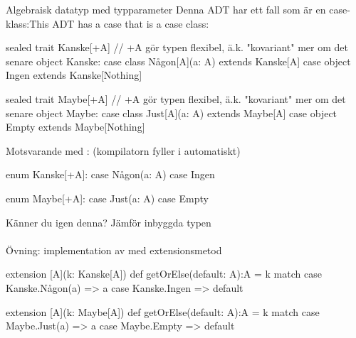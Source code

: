 \begin{Slide}{Algebraisk datatyp med typparameter}\SlideFontSmall
\ifswedish Denna ADT har ett fall som är en  case-klass:\else This ADT has a case that is a  case class:\fi     
\ifswedish
\begin{CodeSmall}
sealed trait Kanske[+A]   // +A gör typen flexibel, ä.k. "kovariant" mer om det senare
object Kanske:
  case class Någon[A](a: A) extends Kanske[A]
  case object Ingen extends Kanske[Nothing]   
\end{CodeSmall}
\else
\begin{CodeSmall}
sealed trait Maybe[+A]   // +A gör typen flexibel, ä.k. "kovariant" mer om det senare
object Maybe:
  case class Just[A](a: A) extends Maybe[A]
  case object Empty extends Maybe[Nothing]   
\end{CodeSmall}
\fi{}
Motsvarande med : (kompilatorn fyller i  automatiskt)
\ifswedish
\begin{CodeSmall}
enum Kanske[+A]:
  case Någon(a: A)
  case Ingen     
\end{CodeSmall}
\else
\begin{CodeSmall}
enum Maybe[+A]:
  case Just(a: A)
  case Empty     
\end{CodeSmall}
\fi{}
Känner du igen denna? Jämför inbyggda typen \\~\\Övning: implementation av  med extensionsmetod 
\ifswedish
\begin{CodeSmall}
extension [A](k: Kanske[A]) def getOrElse(default: A):A = k match 
  case Kanske.Någon(a) => a
  case Kanske.Ingen => default
\end{CodeSmall}
\else
\begin{CodeSmall}
extension [A](k: Maybe[A]) def getOrElse(default: A):A = k match 
  case Maybe.Just(a) => a
  case Maybe.Empty => default
\end{CodeSmall}
\fi{}     
\end{Slide}
